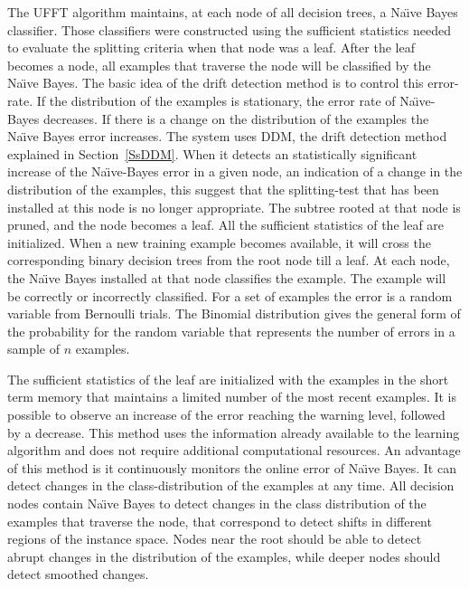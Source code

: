 The UFFT algorithm maintains,
at each node of all decision trees, a Na\"{\i}ve Bayes classifier.
Those classifiers were constructed using the sufficient statistics
needed to evaluate the splitting criteria when that node
was a leaf. After the leaf becomes a node, all examples that
traverse the node will be classified by the Na\"{\i}ve Bayes. The
basic idea of the drift detection method is to control this
error-rate. If the distribution of the examples is stationary,
the error rate of Na\"{\i}ve-Bayes decreases. If there is a
change on the distribution of the examples the Na\"{\i}ve Bayes
error increases. The system uses DDM, the drift detection method explained in Section~\ref{SsDDM}. When it detects  an statistically significant 
increase of the Na\"{\i}ve-Bayes error in a given node, an
indication of a change in the distribution of the examples,
this suggest that the splitting-test that has been installed at
this node is no longer appropriate. The subtree rooted at
that node is pruned, and the node becomes a leaf. All the
sufficient statistics of the leaf are initialized.
When a new training example becomes available, it will
cross the corresponding binary decision trees from the root
node till a leaf. At each node, the Na\"{\i}ve Bayes installed at
that node classifies the example. The example will be correctly
or incorrectly classified. For a set of examples the
error is a random variable from Bernoulli trials. The Binomial
distribution gives the general form of the probability for
the random variable that represents the number of errors in
a sample of $n$ examples. 

The sufficient statistics of the leaf are initialized with
  the examples in the short term memory %
that maintains a limited number of the most recent examples.
It is possible to observe an increase of the error reaching the warning
level, followed by a decrease. This method uses the information already available
to the learning algorithm and does not require additional
computational resources.
An advantage of this method is it continuously monitors
the online error of Na\"{\i}ve Bayes. It can detect changes in the
class-distribution of the examples at any time. All decision
nodes contain Na\"{\i}ve Bayes to detect changes in the class distribution
of the examples that traverse the node, that
correspond to detect shifts in different regions of the instance
space. Nodes near the root should be able to detect abrupt
changes in the distribution of the examples, while deeper
nodes should detect smoothed changes. %

